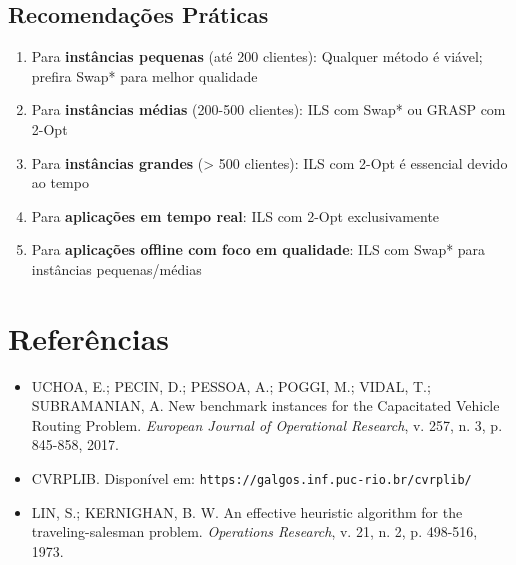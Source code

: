 \documentclass[12pt,a4paper]{article}
\begin{document}
\subsection{Recomendações Práticas}

\begin{enumerate}
    \item Para \textbf{instâncias pequenas} (até 200 clientes): Qualquer método é viável; prefira Swap* para melhor qualidade
    \item Para \textbf{instâncias médias} (200-500 clientes): ILS com Swap* ou GRASP com 2-Opt
    \item Para \textbf{instâncias grandes} (> 500 clientes): ILS com 2-Opt é essencial devido ao tempo
    \item Para \textbf{aplicações em tempo real}: ILS com 2-Opt exclusivamente
    \item Para \textbf{aplicações offline com foco em qualidade}: ILS com Swap* para instâncias pequenas/médias
\end{enumerate}

\section{Referências}

\begin{itemize}
    \item UCHOA, E.; PECIN, D.; PESSOA, A.; POGGI, M.; VIDAL, T.; SUBRAMANIAN, A. New benchmark instances for the Capacitated Vehicle Routing Problem. \textit{European Journal of Operational Research}, v. 257, n. 3, p. 845-858, 2017.
    \item CVRPLIB. Disponível em: \texttt{https://galgos.inf.puc-rio.br/cvrplib/}
    \item LIN, S.; KERNIGHAN, B. W. An effective heuristic algorithm for the traveling-salesman problem. \textit{Operations Research}, v. 21, n. 2, p. 498-516, 1973.
\end{itemize}
\end{document}
